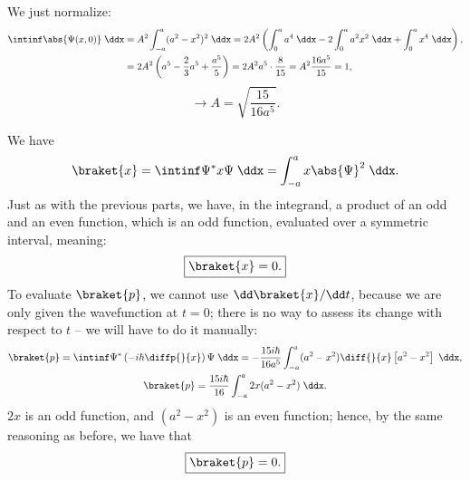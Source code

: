 \begin{parts}
    \item We just normalize:
        \begin{align*}
            \intinf \abs{\Psi(x,0)} \;\ddx &= A^2 \int_{-a}^{a} (a^2-x^2)^2 \;\ddx = 2A^2 \left(\int_0^a a^4 \;\ddx  - 2\int_0^a a^2x^2 \;\ddx + \int_0^a x^4 \;\ddx\right), \\
            &= 2A^2 \left(a^5 - \frac{2}{3} a^5 + \frac{a^5}{5}\right) = 2A^2a^5 \cdot \frac{8}{15} = A^2\frac{16a^5}{15} = 1,
        \end{align*}
        \begin{equation*}
            \rightarrow \boxed{A = \sqrt{\frac{15}{16a^5}}.}
        \end{equation*}
    \item We have
        \begin{equation*}
            \braket{x} = \intinf \Psi^* x \Psi \;\ddx = \int_{-a}^a x\abs{\Psi}^2 \;\ddx.
        \end{equation*}
        Just as with the previous parts, we have, in the integrand, a product of an odd and an even function, which is an odd function, evaluated over a symmetric interval, meaning:   
        \begin{equation*}
            \boxed{\braket{x} = 0.}
        \end{equation*}
        To evaluate $\braket{p}$, we cannot use $\dd \braket{x}/\dd t$, because we are only given the wavefunction at $t=0$; there is no way to assess its change with respect to $t$ -- we will have to do it manually:
        \begin{gather*}
            \braket{p} = \intinf \Psi^* \left(-i\hbar \diffp{}{x}\right) \Psi \;\ddx = -\frac{15i\hbar}{16a^5}\int_{-a}^{a} (a^2 - x^2) \diff{}{x} \left[a^2 - x^2\right] \;\ddx, \\
            \braket{p} = \frac{15i\hbar}{16} \int_{-a}^{a} 2x(a^2-x^2) \;\ddx.
        \end{gather*}
        $2x$ is an odd function, and $(a^2-x^2)$ is an even function; hence, by the same reasoning as before, we have that
        \begin{equation*}
            \boxed{\braket{p} = 0.}
        \end{equation*}


\end{parts}
